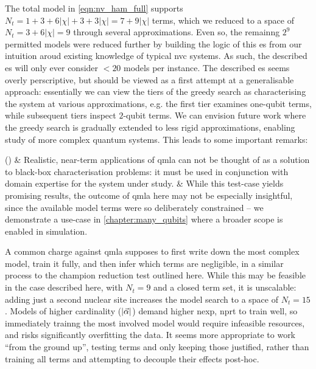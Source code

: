 The total model in \cref{eqn:nv_ham_full} supports $N_t = 1 + 3 + 6 | \chi | + 3 + 3 |\chi| = 7 + 9|\chi| $ terms, 
    which we reduced to a space of $N_t=3 + 6 |\chi| = 9$ through several approximations\footnotemark.
Even so, the remainng $2^9$ permitted models were reduced further by building the logic of this \gls{es} 
    from our intuition aroud existing knowledge of typical \gls{nvc} systems.
As such, the described \gls{es} will only ever consider $<20$ models per instance. 
The described \gls{es} seems overly perscriptive, 
    but should be viewed as a first attempt at a generalisable approach: 
    essentially we can view the tiers of the greedy search as characterising the system 
    at various approximations, 
    e.g. the first tier examines one-qubit terms, while subsequent tiers inspect $2$-qubit terms. 
We can envision future work where the greedy search is gradually extended to less rigid approximations, 
    enabling study of more complex quantum systems.     
This leads to some important remarks:

\begin{easylist}[enumerate]
    \ListProperties()
    & Realistic, near-term applications of \gls{qmla} can not be thought of as a solution to black-box characterisation problems: 
        it must be used in conjunction with domain expertise for the system under study.
    & While this test-case yields promising results, the outcome of \gls{qmla} here may not be especially insightful, 
        since the available model terms were so deliberately constrained -- we demonstrate a use-case in \cref{chapter:many_qubits} 
        where a broader scope is enabled in simulation.    
\end{easylist}   
\par 

A common charge against \gls{qmla} supposes to first write down the most complex model, 
    train it fully, and then infer which terms are negligible, in a similar process to the champion reduction test outlined here. 
While this may be feasible in the case described here, with $N_t=9$ and a closed term set, 
    it is unscalable: adding just a second nuclear site increases the model search to a space of $N_t=15$.
Models of higher cardinality ($|\vec{\alpha}|$) demand higher \gls{nexp}, \gls{nprt} to train well, so immediately trainng the most involved model would 
    require infeasible resources\footnotemark, and risks significantly overfitting the data. 
It seems more appropriate to work ``from the ground up'', testing terms and only keeping those justified, 
    rather than training all terms and attempting to decouple their effects post-hoc. 

